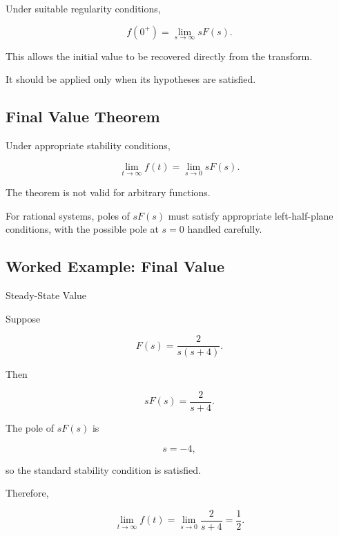 Under suitable regularity conditions,

\[
\boxed{
f(0^+)
=
\lim_{s\to\infty}
sF(s).
}
\]

This allows the initial value to be recovered directly from the transform.

It should be applied only when its hypotheses are satisfied.

\subsection{Final Value Theorem}
\label{subsec:final-value-theorem}

Under appropriate stability conditions,

\[
\boxed{
\lim_{t\to\infty}
f(t)
=
\lim_{s\to0}
sF(s).
}
\]

The theorem is not valid for arbitrary functions.

For rational systems, poles of \(sF(s)\) must satisfy appropriate
left-half-plane conditions, with the possible pole at \(s=0\) handled
carefully.

\subsection{Worked Example: Final Value}
\label{subsec:worked-final-value}

\begin{workedexamplebox}{Steady-State Value}

Suppose

\[
F(s)
=
\frac{
2
}{
s(s+4)
}.
\]

Then

\[
sF(s)
=
\frac2{s+4}.
\]

The pole of \(sF(s)\) is

\[
s=-4,
\]

so the standard stability condition is satisfied.

Therefore,

\begin{answerbox}
\[
\boxed{
\lim_{t\to\infty}
f(t)
=
\lim_{s\to0}
\frac2{s+4}
=
\frac12.
}
\]
\end{answerbox}

\end{workedexamplebox}

